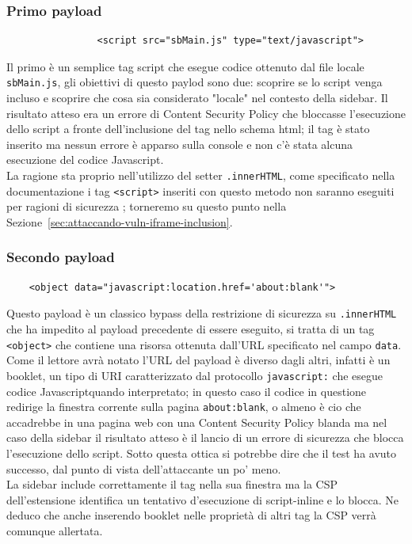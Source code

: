 \documentclass{sapthesis}
\newcommand{\code}[1]{\texttt{#1}}
\newcommand{\file}[1]{\code{#1}}
\newcommand{\attr}[1]{\code{.#1}}
\newcommand{\refSection}[1]{Sezione~\ref{#1}}
\newcommand{\JS}{Javascript}
\begin{document}
        \subsubsection{Primo payload}
            \begin{lstlisting}
                <script src="sbMain.js" type="text/javascript">
\end{lstlisting}
            Il primo è un semplice tag script che esegue codice ottenuto dal file locale \file{sbMain.js},
            gli obiettivi di questo paylod sono due: scoprire se lo script venga incluso e scoprire che 
            cosa sia considerato "locale" nel contesto della sidebar. Il risultato atteso era un errore
            di Content Security Policy che bloccasse l'esecuzione dello script a fronte dell'inclusione del
            tag nello schema html; il tag è stato inserito ma nessun errore è apparso sulla console e non
            c'è stata alcuna esecuzione del codice \JS.\\
            La ragione sta proprio nell'utilizzo del setter \attr{innerHTML}, come specificato nella
            documentazione i tag \code{<script>} inseriti con questo metodo non saranno eseguiti per
            ragioni di sicurezza \cite{innerHTML}; torneremo su questo punto nella \refSection{sec:attaccando-vuln-iframe-inclusion}.

        \subsubsection{Secondo payload}
            \begin{lstlisting}
    <object data="javascript:location.href='about:blank'">
\end{lstlisting}
            Questo payload è un classico bypass della restrizione di sicurezza su \attr{innerHTML} che ha impedito al
            payload precedente di essere eseguito, si tratta di un tag \code{<object>} che contiene una risorsa
            ottenuta dall'URL specificato nel campo \code{data}. Come il lettore avrà notato l'URL del payload
            è diverso dagli altri, infatti è un booklet, un tipo di URI caratterizzato dal protocollo \code{javascript:}
            che esegue codice \JS quando interpretato; in questo caso il codice in questione redirige
            la finestra corrente sulla pagina \code{about:blank}, o almeno è cio che accadrebbe in una pagina web
            con una Content Security Policy blanda ma nel caso della sidebar il risultato atteso è il lancio
            di un errore di sicurezza che blocca l'esecuzione dello script. Sotto questa ottica si potrebbe dire che
            il test ha avuto successo, dal punto di vista dell'attaccante un po' meno.\\
            La sidebar include correttamente il tag nella sua finestra ma la CSP dell'estensione identifica un tentativo
            d'esecuzione di script-inline e lo blocca. Ne deduco che anche inserendo booklet nelle proprietà di
            altri tag la CSP verrà comunque allertata.
\end{document}
